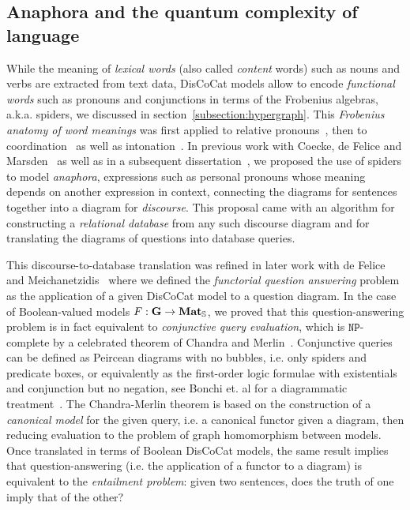 
\subsection{Anaphora and the quantum complexity of language}\label{section:anaphora}

While the meaning of \emph{lexical words} (also called \emph{content} words) such as nouns and verbs are extracted from text data, DisCoCat models allow to encode \emph{functional words} such as pronouns and conjunctions in terms of the Frobenius algebras, a.k.a. spiders, we discussed in section~\ref{subsection:hypergraph}.
This \emph{Frobenius anatomy of word meanings} was first applied to relative pronouns~\cite{SadrzadehEtAl13,SadrzadehEtAl14}, then to coordination~\cite{Kartsaklis16} as well as intonation~\cite{KartsaklisSadrzadeh15}.
In previous work with Coecke, de Felice and Marsden~\cite{CoeckeEtAl18a} as well as in a subsequent dissertation~\cite{Toumi18a}, we proposed the use of spiders to model \emph{anaphora}, expressions such as personal pronouns whose meaning depends on another expression in context, connecting the diagrams for sentences together into a diagram for \emph{discourse}.
This proposal came with an algorithm for constructing a \emph{relational database} from any such discourse diagram and for translating the diagrams of questions into database queries.

This discourse-to-database translation was refined in later work with de Felice and Meichanetzidis~\cite{FeliceEtAl19} where we defined the \emph{functorial question answering} problem as the application of a given DisCoCat model to a question diagram.
In the case of Boolean-valued models $F : \mathbf{G} \to \mathbf{Mat}_{\mathbb{S}}$, we proved that this question-answering problem is in fact equivalent to \emph{conjunctive query evaluation}, which is $\mathtt{NP}$-complete by a celebrated theorem of Chandra and Merlin~\cite{ChandraMerlin77}.
Conjunctive queries can be defined as Peircean diagrams with no bubbles, i.e. only spiders and predicate boxes, or equivalently as the first-order logic formulae with existentials and conjunction but no negation, see Bonchi et. al for a diagrammatic treatment~\cite{BonchiEtAl18}.
The Chandra-Merlin theorem is based on the construction of a \emph{canonical model} for the given query, i.e. a canonical functor given a diagram, then reducing evaluation to the problem of graph homomorphism between models.
Once translated in terms of Boolean DisCoCat models, the same result implies that question-answering (i.e. the application of a functor to a diagram) is equivalent to the \emph{entailment problem}: given two sentences, does the truth of one imply that of the other?

